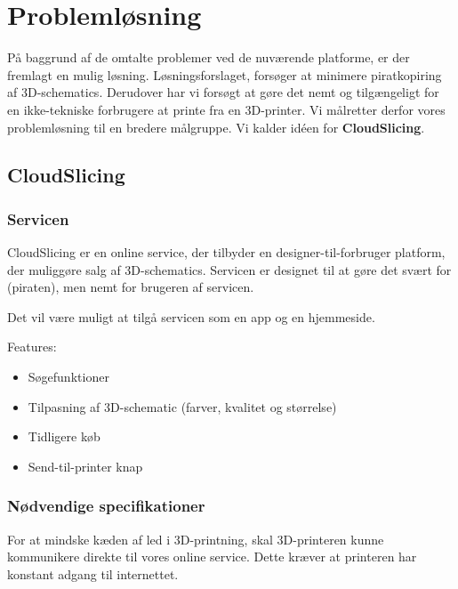 \chapter{Problemløsning} %
\label{cha:probleml_sning}


På baggrund af de omtalte problemer ved de nuværende platforme, er der fremlagt en mulig løsning. Løsningsforslaget, forsøger at minimere piratkopiring af 3D-schematics. Derudover har vi forsøgt at gøre det nemt og tilgængeligt for en ikke-tekniske forbrugere at printe fra en 3D-printer. Vi målretter derfor vores problemløsning til en bredere målgruppe. Vi kalder idéen for \textbf{CloudSlicing}. 

\section{CloudSlicing} %
\label{sec:cloudslicing}

\subsection{Servicen} %
\label{ssub:servicen}

CloudSlicing er en online service, der tilbyder en designer-til-forbruger platform, der muliggøre salg af 3D-schematics. Servicen er designet til at gøre det svært for (piraten), men nemt for brugeren af servicen.

Det vil være muligt at tilgå servicen som en app og en hjemmeside.

Features:
\begin{itemize}
	\item Søgefunktioner
	\item Tilpasning af 3D-schematic (farver, kvalitet og størrelse)
	\item Tidligere køb
	\item Send-til-printer knap
\end{itemize}




\subsection{Nødvendige specifikationer} %
\label{sub:krav_til_3d_teknologien}

For at mindske kæden af led i 3D-printning, skal 3D-printeren kunne kommunikere direkte til vores online service. Dette kræver at printeren har konstant adgang til internettet.

